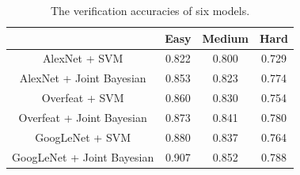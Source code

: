\documentclass[10pt,twocolumn,letterpaper]{article}
\begin{document}
\begin{table}
\small
\centering
\caption{The verification accuracies of six models.}
\begin{tabular}{*{4}{|c}|}
\hline
  & Easy  & Medium & Hard \\
\hline
AlexNet + SVM & 0.822 &	0.800 & 0.729 \\
 \hline
AlexNet + Joint Bayesian & 0.853 &	0.823 & 0.774 \\
 \hline
Overfeat + SVM & 0.860 & 0.830 & 0.754 \\
 \hline
Overfeat + Joint Bayesian & 0.873 &	0.841 & 0.780 \\
 \hline
GoogLeNet + SVM & 0.880 &	0.837 & 0.764 \\
 \hline
GoogLeNet + Joint Bayesian & 0.907 & 0.852 & 0.788 \\
 \hline
\end{tabular}
\label{tab:verif_up}
\end{table}
\end{document}
